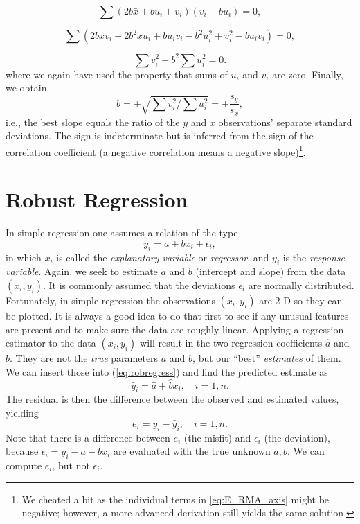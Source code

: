 $$
\sum (2b \bar{x} + bu_i + v_i) (v_i - bu_i) = 0,
$$

$$
\sum (2b \bar{x} v_i - 2b ^2  \bar{x} u_i + b u_i v_i - b^2 u^2_i + v^2_i - b u_i v_i ) = 0,
$$

$$
\sum v^2_i - b^2 \sum u^2_i = 0.
$$
where we again have used the property that sums of $u_i$ and $v_i$ are zero.  Finally, we obtain
\begin{equation}
b = \pm \sqrt{ \sum v^2_i / \sum u^2_i} = \pm \frac{s_y}{s_x},
\end{equation}
i.e., the best slope equals the ratio of the $y$ and $x$ observations' separate standard deviations.
The sign is indeterminate but is inferred from the sign of the correlation coefficient (a negative
correlation means a negative slope)\footnote{We cheated a bit as the individual terms in \ref{eq:E_RMA_axis}
might be negative; however, a more advanced derivation still yields the same solution.}.


\section{Robust Regression}

	In simple regression one assumes a relation of the type
\begin{equation}
y_i = a + b x_i + \epsilon_i,
\label{eq:robregress}
\end{equation}
in which $x_i$ is called the \emph{explanatory variable} or \emph{regressor}, and $y_i$ is the \emph{response variable}.
Again, we seek to estimate $a$ and $b$ (intercept and slope) from the data 
$(x_i , y_i)$.  It is commonly assumed 
that the deviations $\epsilon_i$ are normally distributed.
Fortunately, in simple regression the observations $(x_i, y_i)$ are 2-D so they can be plotted.  It 
is always a good idea to do that first to see if any unusual features are present and to make sure 
the data are roughly linear.
Applying a regression estimator to the data $(x_i, y_i)$ will result in the two regression 
coefficients $\hat{a}$  and $\hat{b}$.  They are not the \emph{true} parameters $a$ and $b$, but our ``best'' \emph{estimates} of 
them.  We can insert those into (\ref{eq:robregress}) and find the predicted estimate as
\begin{equation}
\hat{y}_i = \hat{a} + \hat{b} x_i,\quad i = 1,n.
\end{equation}	 
The residual is then the difference between the observed and estimated values, yielding
\begin{equation}
e_i = y_i - \hat{y}_i,\quad i = 1,n.
\end{equation} 	
Note that there is a difference between $e_i$ (the misfit) and 
$\epsilon_i$ (the deviation), because $\epsilon_i = y_i - a - b x_i$ are
evaluated with the true unknown $a,b$.  We can compute $e_i$, but not $\epsilon_i$.

